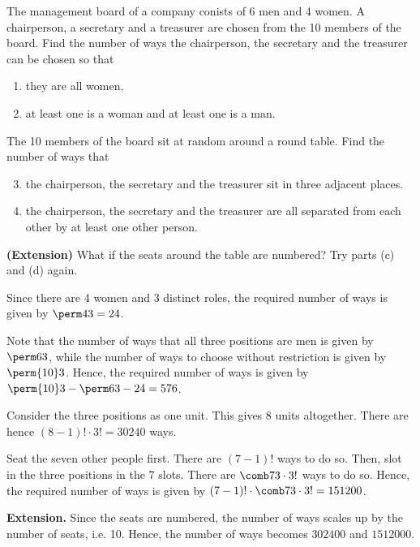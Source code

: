 \begin{problem}
    The management board of a company conists of 6 men and 4 women. A chairperson, a secretary and a treasurer are chosen from the 10 members of the board. Find the number of ways the chairperson, the secretary and the treasurer can be chosen so that
    \begin{enumerate}
        \item they are all women,
        \item at least one is a woman and at least one is a man.
    \end{enumerate}

    The 10 members of the board sit at random around a round table. Find the number of ways that
    \begin{enumerate}
        \setcounter{enumi}{2}
        \item the chairperson, the secretary and the treasurer sit in three adjacent places.
        \item the chairperson, the secretary and the treasurer are all separated from each other by at least one other person.
    \end{enumerate}

    \textbf{(Extension)} What if the seats around the table are numbered? Try parts (c) and (d) again.
\end{problem}
\begin{solution}
    \begin{ppart}
        Since there are 4 women and 3 distinct roles, the required number of ways is given by $\perm43 = 24$.
    \end{ppart}
    \begin{ppart}
        Note that the number of ways that all three positions are men is given by $\perm63$, while the number of ways to choose without restriction is given by $\perm{10}3$. Hence, the required number of ways is given by $\perm{10}3 - \perm63 - 24 = 576$.
    \end{ppart}
    \begin{ppart}
        Consider the three positions as one unit. This gives 8 units altogether. There are hence $(8-1)! \cdot 3! = 30240$ ways.
    \end{ppart}
    \begin{ppart}
        Seat the seven other people first. There are $(7-1)!$ ways to do so. Then, slot in the three positions in the 7 slots. There are $\comb73 \cdot 3!$ ways to do so. Hence, the required number of ways is given by $(7-1)! \cdot \comb73 \cdot 3! = 151200$.
    \end{ppart}

    \medskip

    \noindent\textbf{\sffamily Extension.} Since the seats are numbered, the number of ways scales up by the number of seats, i.e. 10. Hence, the number of ways becomes $302400$ and $1512000$.
\end{solution}